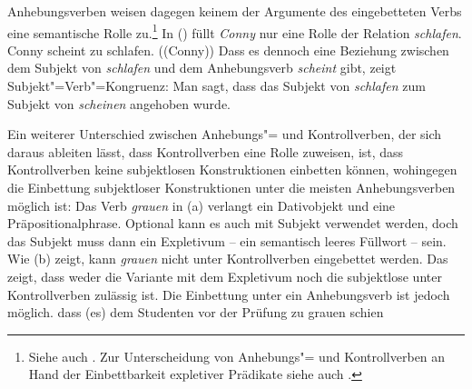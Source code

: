 Anhebungsverben weisen dagegen keinem der Argumente des eingebetteten Verbs eine
semantische Rolle zu.\footnote{
        Siehe auch .
        Zur Unterscheidung von Anhebungs"= und Kontrollverben an Hand
        der Einbettbarkeit expletiver Prädikate siehe auch
        .
}
In () füllt \emph{Conny} nur eine Rolle der Relation \emph{schlafen}.
\eal
\ex Conny scheint zu schlafen.
\ex {}((Conny))
\zl
Dass es dennoch eine Beziehung zwischen dem Subjekt von \emph{schlafen} und dem Anhebungsverb
\emph{scheint} gibt, zeigt Subjekt"=Verb"=Kongruenz:
\eal
{}
\zl
Man sagt, dass das Subjekt von \emph{schlafen} zum Subjekt von \emph{scheinen} angehoben wurde.

Ein weiterer Unterschied zwischen Anhebungs"= und Kontrollverben, der sich daraus ableiten lässt, dass
Kontrollverben eine Rolle zuweisen, ist, dass Kontrollverben keine subjektlosen Konstruktionen einbetten
können, wohingegen die Einbettung subjektloser Konstruktionen unter die meisten Anhebungsverben
möglich ist:
\eal
{}
\zl
Das Verb \emph{grauen} in (a) verlangt ein Dativobjekt und eine Präpositionalphrase.
Optional kann es auch mit Subjekt verwendet werden, doch das Subjekt muss dann ein Expletivum -- ein semantisch
leeres Füllwort -- sein. Wie (b) zeigt, kann \emph{grauen} nicht unter Kontrollverben eingebettet werden.
Das zeigt, dass weder die Variante mit dem Expletivum noch die subjektlose unter Kontrollverben
zulässig ist. Die Einbettung unter ein Anhebungsverb ist jedoch möglich. 
\ea
dass (es) dem Studenten vor der Prüfung zu grauen schien
\z

